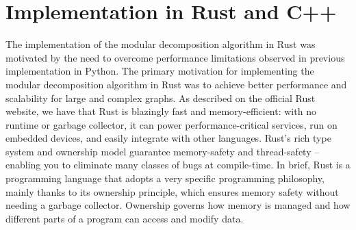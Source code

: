 

\chapter{Implementation in Rust and C++}\label{ch:implementation-in-rust-and-cpp}

The implementation of the modular decomposition algorithm in Rust was motivated by the need to overcome performance limitations observed in previous implementation in Python.
The primary motivation for implementing the modular decomposition algorithm in Rust was to achieve better performance and scalability for large and complex graphs.
As described on the official Rust website, we have that Rust is blazingly fast and memory-efficient: with no runtime or garbage collector, it can power performance-critical services, run on embedded devices, and easily integrate with other languages.
Rust's rich type system and ownership model guarantee memory-safety and thread-safety -- enabling you to eliminate many classes of bugs at compile-time.
In brief, Rust is a programming language that adopts a very specific programming philosophy, mainly thanks to its ownership principle, which ensures memory safety without needing a garbage collector.
Ownership governs how memory is managed and how different parts of a program can access and modify data.

